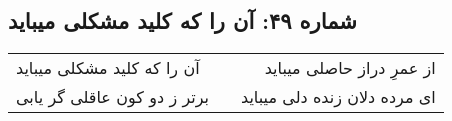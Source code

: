 \begin{center}
\section*{شماره ۴۹: آن را که کلید مشکلی میباید}
\label{sec:049}
\begin{longtable}{l p{0.5cm} r}
آن را که کلید مشکلی میباید
&&
از عمرِ دراز حاصلی میباید
\\
برتر ز دو کون عاقلی گر یابی
&&
ای مرده دلان زنده دلی میباید
\\
\end{longtable}
\end{center}
